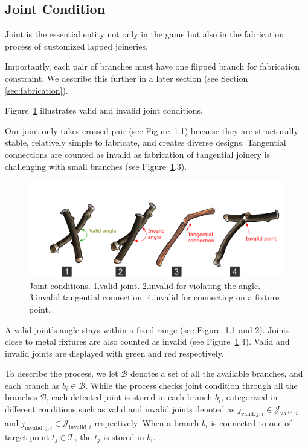 \subsection{Joint Condition}
\label{sec:joint}
Joint is the essential entity not only in the game but also in the fabrication process of customized lapped joineries.

Importantly, each pair of branches must have one flipped branch for fabrication constraint.
We describe this further in a later section (see Section \ref{sec:fabrication}).

Figure~\ref{fig:joint_condition} illustrates valid and invalid joint conditions.

Our joint only takes crossed pair (see Figure~\ref{fig:joint_condition}.1) because they are structurally stable, relatively simple to fabricate, and creates diverse designs.
Tangential connections are counted as invalid as fabrication of tangential joinery is challenging with small branches (see Figure~\ref{fig:joint_condition}.3).

\begin{figure}[ht]
	\begin{center}
		\includegraphics[width = 0.4\paperwidth]{images/system/joint_conditions_2.png}
		\caption{Joint conditions. 1.valid joint. 2.invalid for violating the angle. 3.invalid tangential connection. 4.invalid for connecting on a fixture point. }
		\label{fig:joint_condition}
	\end{center}
\end{figure}


A valid joint's angle stays within a fixed range (see Figure~\ref{fig:joint_condition}.1 and 2).
Joints close to metal fixtures are also counted as invalid (see Figure~\ref{fig:joint_condition}.4).
Valid and invalid joints are displayed with green and red respectively.

To describe the process, we let $\mathcal{B}$ denotes a set of all the available branches, and each branch as $ b_i \in \mathcal{B}$.
While the process checks joint condition through all the branches $\mathcal{B}$, each detected joint is stored in each branch $b_i$, categorized in different conditions such as valid and invalid joints denoted as $j_{\text{valid}, j, i} \in \mathcal{J}_{\text{valid},i}$ and $j_{\text{invalid}, j, i} \in \mathcal{J}_{\text{invalid},i}$ respectively.
When a branch $b_i$ is connected to one of target point $t_j \in \mathcal{T} $, the $t_j$ is stored in $b_i$.


